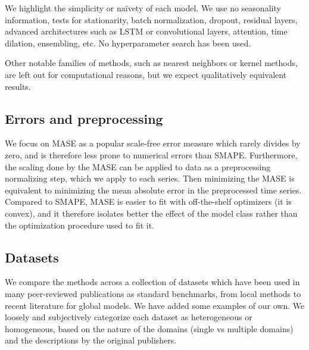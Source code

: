 \documentclass[a4paper]{article}
\theoremstyle{custom}
\begin{document}
We highlight the simplicity or naïvety of each model. We use no seasonality information, tests for stationarity, batch normalization, dropout, residual layers, advanced architectures such as LSTM or convolutional layers, attention, time dilation, ensembling, etc. No hyperparameter search has been used.

Other notable families of methods, such as nearest neighbors or kernel methods, are left out for computational reasons, but we expect qualitatively equivalent results.

\subsection{Errors and preprocessing}

We focus on MASE as a popular scale-free error measure which rarely divides by zero, and is therefore less prone to numerical errors than SMAPE\@. Furthermore, the scaling done by the MASE can be applied to data as a preprocessing normalizing step, which we apply to each series. Then minimizing the MASE is equivalent to minimizing the mean absolute error in the preprocessed time series. Compared to SMAPE, MASE is easier to fit with off-the-shelf optimizers (it is convex), and it therefore isolates better the effect of the model class rather than the optimization procedure used to fit it.

\subsection{Datasets}

We compare the methods across a collection of datasets which have been used in many peer-reviewed publications as standard benchmarks, from local methods to recent literature for global models. We have added some examples of our own. We loosely and subjectively categorize each dataset as heterogeneous or homogeneous, based on the nature of the domains (single vs multiple domains) and the descriptions by the original publishers.
\end{document}
